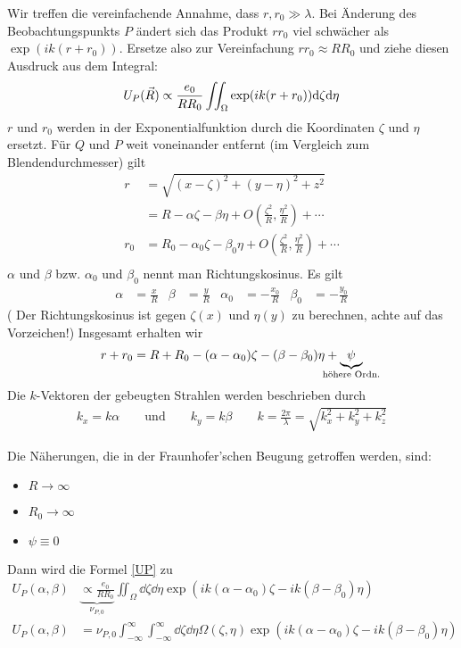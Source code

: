 Wir treffen die vereinfachende Annahme, dass $r, r_0\gg\lambda$.
Bei Änderung des Beobachtungspunkts $P$ ändert sich das Produkt $rr_0$
viel schwächer als $\exp(ik(r+r_0))$. Ersetze also zur Vereinfachung
$rr_0\approx RR_0$ und ziehe diesen Ausdruck aus dem Integral:
\begin{gather*}
  U_P(\vec{R}) \propto \frac{e_0}{RR_0} \iint_{\Omega} 
  \exp(ik(r+r_0)) \mathrm{d}\zeta\mathrm{d}\eta  
  \label{UP}
\end{gather*}
$r$ und $r_0$ werden in der Exponentialfunktion durch die Koordinaten
$\zeta$ und $\eta$ ersetzt.
Für $Q$ und $P$ weit voneinander entfernt (im Vergleich zum
Blendendurchmesser) gilt
\begin{align*}
  r &= \sqrt{(x-\zeta)^2+(y-\eta)^2+z^2} \\
    &= R-\alpha\zeta - \beta\eta 
      + O\left(\frac{\zeta^2}{R},\frac{\eta^2}{R}\right)
      + \dotsb \\
  r_0 &= R_0-\alpha_0\zeta - \beta_0\eta 
        + O\left(\frac{\zeta^2}{R},\frac{\eta^2}{R}\right)
        + \dotsb \\
\end{align*}
$\alpha$ und $\beta$ bzw. $\alpha_0$ und $\beta_0$ nennt man
Richtungskosinus. Es gilt
\begin{align*}
  \alpha &= \frac{x}{R}
  &\beta &= \frac{y}{R}
  &\alpha_0 &= -\frac{x_0}{R}
  &\beta_0 &= -\frac{y_0}{R}
\end{align*}
( Der Richtungskosinus ist gegen $\zeta(x)$ und $\eta(y)$ zu
berechnen, achte auf das Vorzeichen!)
Insgesamt erhalten wir
\begin{align*}
  r+r_0 = R+R_0 - (\alpha-\alpha_0)\zeta - (\beta-\beta_0)\eta 
  + \underbrace{\psi}_{\mathclap{\text{höhere Ordn.}}}
\end{align*}
Die $k$-Vektoren der gebeugten Strahlen werden beschrieben durch
\begin{align*}
  k_x = k\alpha \qquad \text{und}\qquad k_y = k\beta
  \qquad k=\frac{2\pi}{\lambda}=\sqrt{k_x^2+k_y^2+k_z^2}
\end{align*}

Die Näherungen, die in der Fraunhofer'schen Beugung getroffen werden,
sind:
\begin{itemize}
\item $R\rightarrow\infty$
\item $R_0\rightarrow\infty$
\item $\psi\equiv 0$
\end{itemize}
Dann wird die Formel \eqref{UP} zu
\begin{align*}
  U_P(\alpha,\beta) 
  & \underbrace{\propto \frac{e_0}{RR_0}}_{\nu_{P,0}} 
    \iint_{\Omega} \dd\zeta\dd\eta
    \exp\left( ik(\alpha-\alpha_0)\zeta - ik(\beta-\beta_0)\eta \right)\\
  U_P(\alpha,\beta) 
  &= \nu_{P,0} \int_{-\infty}^{\infty}\int_{-\infty}^{\infty}
    \dd\zeta\dd\eta \Omega(\zeta,\eta)
    \exp\left( ik(\alpha-\alpha_0)\zeta - ik(\beta-\beta_0)\eta \right)
\end{align*}


